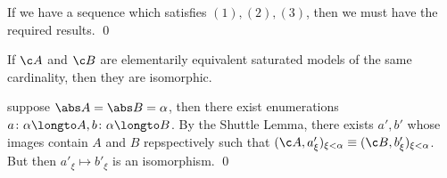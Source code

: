 If we have a sequence which satisfies $(1),(2),(3)$, then we must have the required results.
\qed

\bthrm[title=Uniqueness of Saturated Models, name=uniqsat]

    If $\c A$ and $\c B$ are elementarily equivalent saturated models of the same cardinality, then they are isomorphic.

\ethrm

\Proof suppose $\abs A=\abs B=\alpha$, then there exist enumerations $a\colon\alpha\longto A,b\colon\alpha\longto B$.
By the Shuttle Lemma, there exists $a',b'$ whose images contain $A$ and $B$ repspectively such that $(\c A,a'_\xi)_{\xi<\alpha}\equiv(\c B,b'_\xi)_{\xi<\alpha}$.
But then $a'_\xi\mapsto b'_\xi$ is an isomorphism.
\qed

